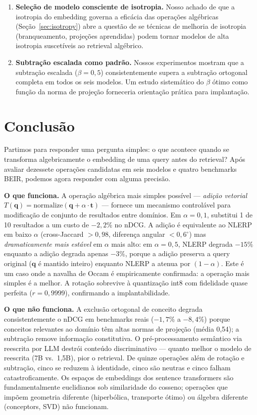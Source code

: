 \documentclass{article}
\begin{document}
\begin{enumerate}
\item \textbf{Seleção de modelo consciente de isotropia.} Nosso achado de que a isotropia do embedding governa a eficácia das operações algébricas (Seção~\ref{sec:isotropy}) abre a questão de se técnicas de melhoria de isotropia (branqueamento, projeções aprendidas) podem tornar modelos de alta isotropia suscetíveis ao retrieval algébrico.

\item \textbf{Subtração escalada como padrão.} Nossos experimentos mostram que a subtração escalada ($\beta = 0{,}5$) consistentemente supera a subtração ortogonal completa em todos os seis modelos. Um estudo sistemático do $\beta$ ótimo como função da norma de projeção forneceria orientação prática para implantação.
\end{enumerate}

\section{Conclusão}

Partimos para responder uma pergunta simples: o que acontece quando se transforma algebricamente o embedding de uma query antes do retrieval? Após avaliar dezessete operações candidatas em seis modelos e quatro benchmarks BEIR, podemos agora responder com alguma precisão.

\textbf{O que funciona.} A operação algébrica mais simples possível --- \emph{adição vetorial} $T(\mathbf{q}) = \text{normalize}(\mathbf{q} + \alpha \cdot \mathbf{t})$ --- fornece um mecanismo controlável para modificação de conjunto de resultados entre domínios. Em $\alpha = 0{,}1$, substitui 1 de 10 resultados a um custo de $-2{,}2\%$ no nDCG. A adição é equivalente ao NLERP em baixo $\alpha$ (cross-Jaccard $> 0{,}98$, diferença angular $< 0{,}6^{\circ}$) mas \emph{dramaticamente mais estável} em $\alpha$ mais alto: em $\alpha = 0{,}5$, NLERP degrada $-15\%$ enquanto a adição degrada apenas $-3\%$, porque a adição preserva a query original ($\mathbf{q}$ é mantido inteiro) enquanto NLERP a atenua por $(1-\alpha)$. Este é um caso onde a navalha de Occam é empiricamente confirmada: a operação mais simples é a melhor. A rotação sobrevive à quantização int8 com fidelidade quase perfeita ($r = 0{,}9999$), confirmando a implantabilidade.

\textbf{O que não funciona.} A exclusão ortogonal de conceito degrada consistentemente o nDCG em benchmarks reais ($-1{,}7\%$ a $-8{,}4\%$) porque conceitos relevantes ao domínio têm altas normas de projeção (média 0,54); a subtração remove informação constitutiva. O pré-processamento semântico via reescrita por LLM destrói conteúdo discriminativo --- quanto melhor o modelo de reescrita (7B vs.\ 1,5B), pior o retrieval. De quinze operações além de rotação e subtração, cinco se reduzem à identidade, cinco são neutras e cinco falham catastroficamente. Os espaços de embeddings dos sentence transformers são fundamentalmente euclidianos sob similaridade do cosseno; operações que impõem geometria diferente (hiperbólica, transporte ótimo) ou álgebra diferente (conceptors, SVD) não funcionam.
\end{document}
